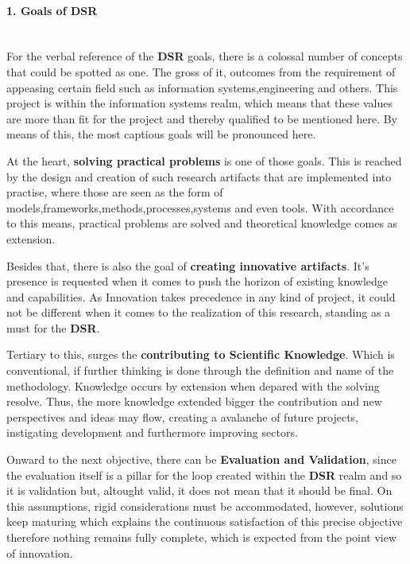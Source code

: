 \paragraph{1. Goals of DSR}\mbox{}\\
For the verbal reference of the \textbf{DSR} goals, there is a colossal number of concepts that could be spotted as one. The gross of it, outcomes from the requirement of appeasing certain field such as information systems,engineering and others. This project is within the information systems realm, which means that these values are more than fit for the project and thereby qualified to be mentioned here. By means of this, the most captious goals will be pronounced here.

At the heart, \textbf{solving practical problems} is one of those goals. This is reached by the design and creation of such research artifacts that are implemented into practise, where those are seen as the form of models,frameworks,methods,processes,systems and even tools. With accordance to this means, practical problems are solved and theoretical knowledge comes as extension.

Besides that, there is also the goal of \textbf{creating innovative artifacts}. It's presence is requested when it comes to push the horizon of existing knowledge and capabilities. As Innovation takes precedence in any kind of project, it could not be different when it comes to the realization of this research, standing as a must for the \textbf{DSR}.

Tertiary to this, surges the \textbf{contributing to Scientific Knowledge}. Which is conventional, if further thinking is done through the definition and name of the methodology. Knowledge occurs by extension when depared with the solving resolve. Thus, the more knowledge extended bigger the contribution and new perspectives and ideas may flow, creating a avalanche of future projects, instigating development and furthermore improving sectors.

Onward to the next objective, there can be \textbf{Evaluation and Validation}, since the evaluation itself is a pillar for the loop created within the \textbf{DSR} realm and so it is validation but, altought valid, it does not mean that it should be final. On this assumptions, rigid considerations must be accommodated, however, solutions keep maturing which explains the continuous satisfaction of this precise objective therefore nothing remains fully complete, which is expected from the point view of innovation.


